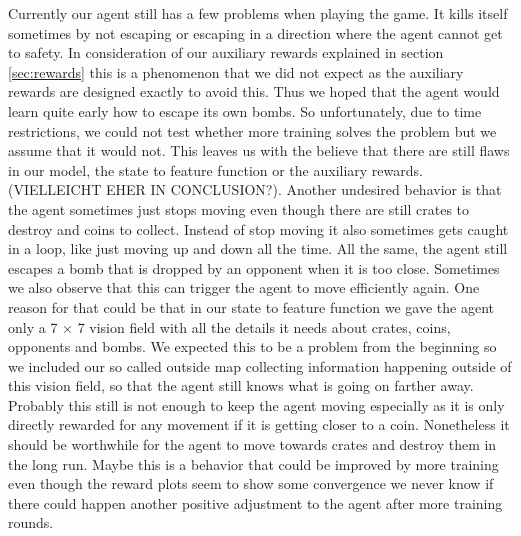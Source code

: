 Currently our agent still has a few problems when playing the game. It kills itself sometimes by not escaping or escaping in a direction where the agent cannot get to safety. In consideration of our auxiliary rewards explained in section \ref{sec:rewards} this is a phenomenon that we did not expect as the auxiliary rewards are designed exactly to avoid this. Thus we hoped that the agent would learn quite early how to escape its own bombs. So unfortunately, due to time restrictions, we could not test whether more training solves the problem but we assume that it would not. This leaves us with the believe that there are still flaws in our model, the state to feature function or the auxiliary rewards. (VIELLEICHT EHER IN CONCLUSION?). Another undesired behavior is that the agent sometimes just stops moving even though there are still crates to destroy and coins to collect. Instead of stop moving it also sometimes gets caught in a loop, like just moving up and down all the time. All the same, the agent still escapes a bomb that is dropped by an opponent when it is too close. Sometimes we also observe that this can trigger the agent to move efficiently again. One reason for that could be that in our state to feature function we gave the agent only a 7 $\times$ 7 vision field with all the details it needs about crates, coins, opponents and bombs. We expected this to be a problem from the beginning so we included our so called outside map collecting information happening outside of this vision field, so that the agent still knows what is going on farther away. Probably this still is not enough to keep the agent moving especially as it is only directly rewarded for any movement if it is getting closer to a coin. Nonetheless it should be worthwhile for the agent to move towards crates and destroy them in the long run. Maybe this is a behavior that could be improved by more training even though the reward plots seem to show some convergence we never know if there could happen another positive adjustment to the agent after more training rounds.
